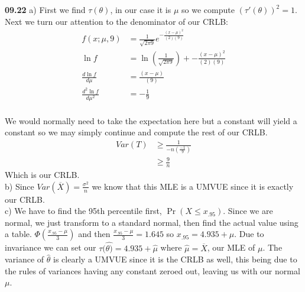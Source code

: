 

{\bf 09.22} a) First we find $\tau(\theta)$, in our case it is $\mu$ so we compute $(\tau'(\theta))^2 = 1$. Next we turn
our attention to the denominator of our CRLB: \\
\begin{align*}
	f(x;\mu,9) & =	\frac{1}{\sqrt{2 \pi 9}} e^{-\frac{(x - \mu)^{2}}{(2)(9)}} \\
	\ln f & = \ln \left( \frac{1}{\sqrt{2 \pi 9}}\right) +  - \frac{(x - \mu)^{2}}{(2)(9)} \\
	\frac{d \ln f}{d \mu} & = \frac{(x - \mu)}{(9)} \\
	\frac{d^2 \ln f}{d \mu^2} & =  - \frac{1}{9} \\
\end{align*} 

We would normally need to take the expectation here but a constant will yield a constant so we may simply continue
and compute the rest of our CRLB. \\
\begin{align*}
	Var(T) & \geq \frac{1}{ - n \left( \frac{-1}{9} \right) } \\
		& \geq \frac {9}{n} 
\end{align*}
Which is our CRLB. \\

b) Since $Var(\overline{X}) = \frac{\sigma^2}{n}$ we know that this MLE is a UMVUE since it is exactly our CRLB. \\

c) We have to find the 95th percentile first,  $\Pr ( X \leq x_{.95} )$. Since we are normal, we just transform to
a standard normal, then find the actual value using a table. $\Phi \left( \frac{x_{.95} - \mu}{3} \right) $ and then 
$\frac{x_{.95} - \mu}{3} = 1.645$ so $x_{.95} = 4.935 + \mu$. Due to invariance we can set our 
$\tau(\hat{\theta)} = 4.935 + \hat{\mu}$ where $\hat{\mu} = \overline{X}$, our MLE of $\mu$. The variance of $\hat{\theta}$
is clearly a UMVUE since it is the CRLB as well, this being due to the  rules of variances having any constant zeroed out, 
leaving us with our normal $\mu$. \\



